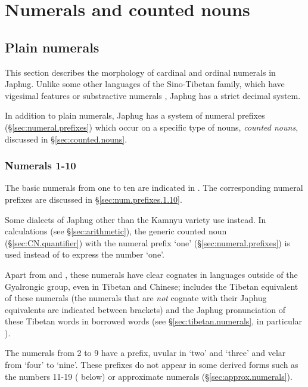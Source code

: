 \chapter{Numerals and counted nouns}  \label{chap:numerals}

\section{Plain numerals} \label{sec:plain.numerals}
This section describes the morphology of cardinal and ordinal numerals in Japhug. Unlike some other languages of the Sino-Tibetan family, which have vigesimal features or substractive numerals \citep{mazaudon02nombre}, Japhug has a strict decimal system.

In addition to plain numerals, Japhug has a system of numeral prefixes (§\ref{sec:numeral.prefixes}) which occur on a specific type of nouns, \textit{counted nouns}, discussed in §\ref{sec:counted.nouns}.

\subsection{Numerals 1-10}  \label{sec:one.to.ten}
The basic numerals from one to ten are indicated in . The corresponding numeral prefixes are discussed in §\ref{sec:num.prefixes.1.10}.

Some dialects of Japhug other than the Kamnyu variety use  instead. In calculations (see §\ref{sec:arithmetic}), the generic counted noun  (§\ref{sec:CN.quantifier}) with the numeral prefix `one' (§\ref{sec:numeral.prefixes}) 
is used instead of  to express the number `one'.

Apart from  and , these numerals have clear cognates in languages outside of the Gyalrongic group, even in Tibetan and Chinese;  includes the Tibetan equivalent of these numerals (the numerals that are \textit{not} cognate with their Japhug equivalents are indicated between brackets) and the Japhug pronunciation of these Tibetan words in borrowed words (see §\ref{sec:tibetan.numerals}, in particular ).

The numerals from 2 to 9 have a prefix, uvular  in `two' and `three' and velar  from `four' to `nine'. These prefixes do not appear in some derived forms such as the numbers 11-19 ( below) or approximate numerals (§\ref{sec:approx.numerals}).

